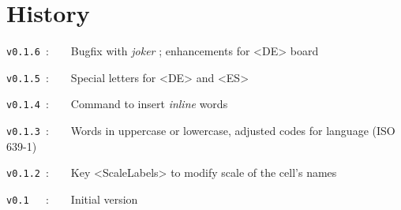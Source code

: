 \documentclass{article}
\begin{document}
\begin{PresentationCode}{}
{\Huge {}}

{\Huge {}}
\end{PresentationCode}

\newpage

\part*{History}

\verb|v0.1.6|~:~~~~Bugfix with \textit{joker} ; enhancements for \textsf{<DE>} board

\verb|v0.1.5|~:~~~~Special letters for \textsf{<DE>} and \textsf{<ES>}

\verb|v0.1.4|~:~~~~Command to insert \textit{inline} words

\verb|v0.1.3|~:~~~~Words in uppercase or lowercase, adjusted codes for language (ISO 639-1)

\verb|v0.1.2|~:~~~~Key \textsf{<ScaleLabels>} to modify scale of the cell's names

\verb|v0.1  |~:~~~~Initial version
\end{document}
